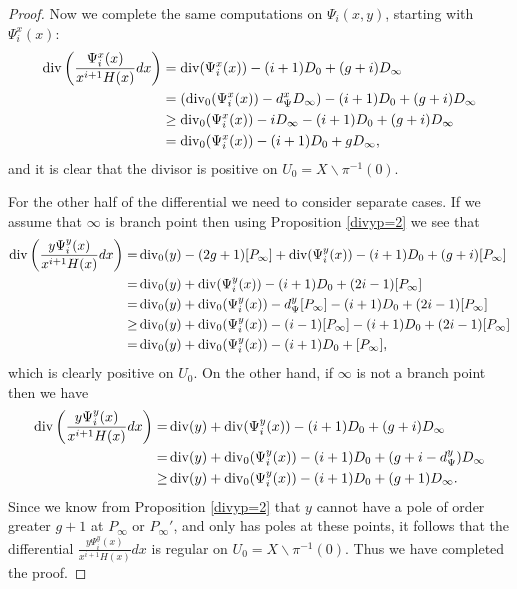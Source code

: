 \begin{proof}
    Now we complete the same computations on $\Psi_i(x,y)$, starting with $\Psi_i^x(x)$:
        \begin{align*}
        \operatorname{div}\left( \frac{\Psi_i^x(x) }{x^{i+1}H(x)}dx \right)  & =   \operatorname{div}(\Psi_i^x(x))  - (i+1)D_0 + (g+i)D_\infty \\
        & = (\operatorname{div}_0(\Psi_i^x(x)) -d_\Psi^xD_\infty) - (i+1)D_0 + (g+i)D_\infty \\
         & \geq   \operatorname{div}_0(\Psi_i^x(x) ) - iD_\infty - (i+1)D_0 + (g+i)D_\infty \\
         & =   \operatorname{div}_0(\Psi_i^x(x)) - (i+1)D_0 + gD_\infty,
        \end{align*}
    and it is clear that the divisor is positive on $U_0 = X \backslash \pi^{-1}(0)$.
    
    For the other half of the differential we need to consider separate cases.
    If we assume that $\infty$ is branch point then  using Proposition \ref{divyp=2} we see that
        \begin{align*}
        \operatorname{div}\left(\frac{y\Psi_i^y(x) }{x^{i+1}H(x)}dx \right)  =  & \operatorname{div}_0(y) - (2g+1)[P_\infty] + \operatorname{div}(\Psi_i^y(x)) - (i+1)D_0 + (g+i)[P_\infty] \\
         =  & \operatorname{div}_0(y) + \operatorname{div}(\Psi_i^y(x)) -(i+1)D_0 + (2i -1)[P_\infty] \\
         = &  \operatorname{div}_0(y) + \operatorname{div}_0(\Psi_i^y(x)) - d_\Psi^y[P_\infty] - (i+1)D_0 + (2i-1)[P_\infty] \\
         \geq &  \operatorname{div}_0(y) + \operatorname{div}_0(\Psi_i^y(x)) -(i-1)[P_\infty] -(i+1)D_0 + (2i-1)[P_\infty] \\
         =   &\operatorname{div}_0(y) + \operatorname{div}_0(\Psi_i^y(x)) -(i+1)D_0 + [P_\infty],
        \end{align*}
    which is clearly positive on $U_0$.
    On the other hand, if $\infty$ is not a branch point then we have
        \begin{align*}
        \operatorname{div}\left(\frac{y\Psi_i^y(x) }{x^{i+1}H(x)}dx \right)  =  & \operatorname{div}(y) + \operatorname{div}(\Psi_i^y(x)) - (i+1)D_0 + (g+i)D_\infty \\
        = & \operatorname{div}(y) + \operatorname{div}_0(\Psi_i^y(x)) - (i+1)D_0 + (g+i - d_\Psi^y)D_\infty \\
        \geq & \operatorname{div}(y) + \operatorname{div}_0(\Psi_i^y(x)) - (i+1)D_0 + (g+1)D_\infty. \\
        \end{align*}
    Since we know from Proposition \ref{divyp=2} that $y$ cannot have a pole of order greater $g+1$ at $P_\infty$ or $P_\infty'$, and only has poles at these points, it follows that the differential $\frac{y\Psi_i^y(x) }{x^{i+1}H(x)}dx$ is regular on $U_0 = X \backslash \pi^{-1}(0)$.
    Thus we have completed the proof.
    
    
    \end{proof}


